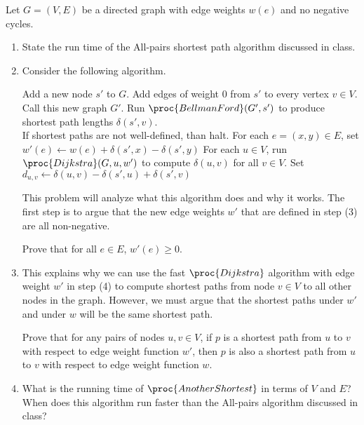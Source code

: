 \documentclass[11pt]{article}
\begin{document}
\noindent Let $G=(V,E)$ be a directed graph with edge weights $w(e)$ and no negative cycles.

\begin{enumerate}

\item State the run time of the All-pairs shortest path algorithm discussed in class.


\item Consider the following algorithm.

\begin{codebox}
\li Add a new node $s'$ to $G$. Add edges of weight $0$ from $s'$ to every vertex $v\in V$.\\
Call this new graph $G'$.
\li Run $\proc{BellmanFord}(G',s')$ to produce shortest path lengths $\delta(s',v)$.\\
If shortest paths are not well-defined, than halt.
\li For each $e=(x,y)\in E$, set $w'(e) \gets w(e) + \delta(s',x) - \delta(s',y)$
\li For each $u\in V$, run $\proc{Dijkstra}(G,u,w')$ to compute $\delta(u,v)$ for all $v\in V$.
\li Set $d_{u,v} \gets \delta(u,v) - \delta(s',u) + \delta(s',v)$
\end{codebox}

\noindent This problem will analyze what this algorithm does and why it works.  The first step is to argue that the new edge weights $w'$ that are defined in step (3) are all non-negative.

Prove that for all $e\in E$, $w'(e) \geq 0$.


\item This explains why we can use the fast $\proc{Dijkstra}$ algorithm with edge weight $w'$ in step (4) to compute shortest paths from node $v\in V$ to all other nodes in the graph.  However, we must argue that the shortest paths under $w'$ and under $w$ will be the same shortest path.

 Prove that for any pairs of nodes $u,v\in V$, if $p$ is a shortest path from $u$ to $v$
with respect to edge weight function $w'$, then $p$ is also a shortest path from $u$ to $v$ with respect to
edge weight function $w$.


\item  What is the running time of $\proc{AnotherShortest}$ in terms of $V$ and $E$?  When
does this algorithm run faster than the All-pairs algorithm discussed in class?
\end{enumerate}
\end{document}
